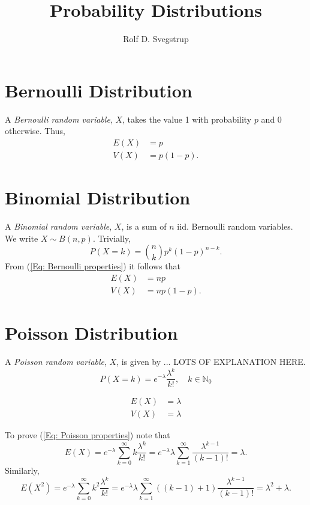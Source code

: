 \documentclass{article}
\title{Probability Distributions}
\author{Rolf D. Svegstrup}
\begin{document}
\maketitle

\section{Bernoulli Distribution}
A \emph{Bernoulli random variable}, $X$, takes the value 1 with probability $p$ and 0 otherwise. Thus,
\begin{equation}
\label{Eq: Bernoulli properties}
\begin{split}
E(X) &= p \\ 
V(X) &= p(1-p).
\end{split}
\end{equation}

\section{Binomial Distribution}
A \emph{Binomial random variable}, $X$, is a sum of $n$ iid. Bernoulli random variables. We write $X \sim B(n, p)$. Trivially,
\begin{equation}
P(X = k) = {n \choose k} p^k (1-p)^{n-k}.
\end{equation}
From (\ref{Eq: Bernoulli properties}) it follows that
\begin{equation}
\begin{split}
E(X) &= np \\
V(X) &= np(1-p) .
\end{split}
\end{equation}

\section{Poisson Distribution}
A \emph{Poisson random variable}, $X$, is given by ... LOTS OF EXPLANATION HERE.
\begin{equation}
P(X = k) = e^{-\lambda} \frac{\lambda^k}{k!}, \quad k \in \mathbb{N}_0
\end{equation}

\begin{equation}
\label{Eq: Poisson properties}
\begin{split}
E(X) &= \lambda \\
V(X) &= \lambda
\end{split}
\end{equation}

To prove (\ref{Eq: Poisson properties}) note that
\begin{equation*}
E(X) = e^{-\lambda} \sum_{k=0}^\infty k \frac{\lambda^k}{k!} = e^{-\lambda} \lambda \sum_{k=1}^\infty \frac{\lambda^{k-1}}{(k-1)!} = \lambda.
\end{equation*}
Similarly,
\begin{equation*}
E(X^2) = e^{-\lambda} \sum_{k=0}^\infty k^2 \frac{\lambda^k}{k!} = e^{-\lambda} \lambda \sum_{k=1}^\infty ((k-1) + 1) \frac{\lambda^{k-1}}{(k-1)!}
 = \lambda^2 + \lambda.
 \end{equation*}
 
\end{document}
